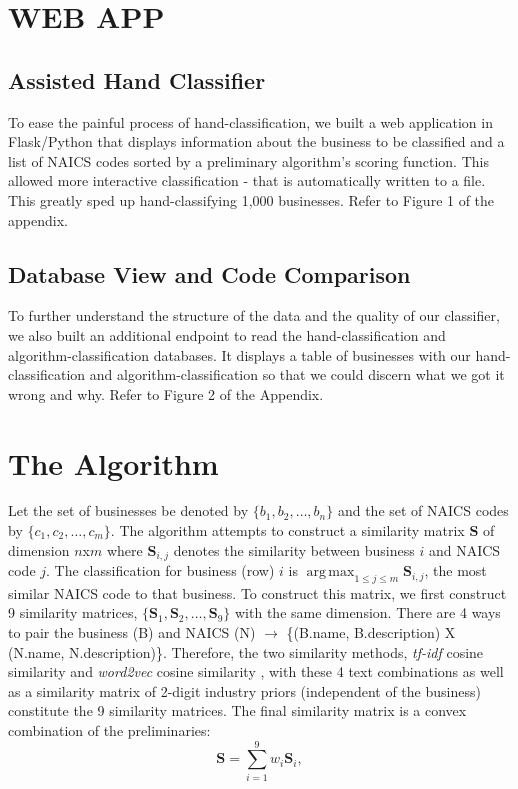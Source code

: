 \documentclass[letterpaper, 9 pt, conference]{IEEEtran}
\DeclareMathOperator*{\argmax}{arg\,max}
\newcommand{\matr}[1]{\mathbf{#1}}
\begin{document}
\section{WEB APP}

\subsection{Assisted Hand Classifier}

To ease the painful process of hand-classification, we built a web application in Flask/Python that displays information about the business to be classified and a list of NAICS codes sorted by a preliminary algorithm's scoring function. This allowed more interactive classification - that is automatically written to a file. This greatly sped up hand-classifying 1,000 businesses. Refer to Figure 1 of the appendix.

\subsection{Database View and Code Comparison}

To further understand the structure of the data and the quality of our classifier, we also built an additional endpoint to read the hand-classification and algorithm-classification databases. It displays a table of businesses with our hand-classification and algorithm-classification so that we could discern what we got it wrong and why. Refer to Figure 2 of the Appendix.

\section{The Algorithm}

Let the set of businesses be denoted by $\{b_1,b_2,\dots,b_n\}$ and the set of NAICS codes by $\{c_1,c_2,\dots,c_m\}$. The algorithm attempts to construct a similarity matrix $\matr{S}$ of dimension $n$x$m$ where $\matr{S}_{i,j}$ denotes the similarity between business $i$ and NAICS code $j$. The classification for business (row) $i$ is $\argmax_{1 \leq j \leq m} \matr{S}_{i,j}$, the most similar NAICS code to that business. To construct this matrix, we first construct 9 similarity matrices, $\{\matr{S}_1,\matr{S}_2,\dots,\matr{S}_9\}$ with the same dimension. There are 4 ways to pair the business (B) and NAICS (N) $\rightarrow$ \{(B.name, B.description) X (N.name, N.description)\}. Therefore, the two similarity methods, \textit{tf-idf} cosine similarity \cite{tfidf} and \textit{word2vec} cosine similarity \cite{neural}, with these 4 text combinations as well as a similarity matrix of 2-digit industry priors (independent of the business) constitute the 9 similarity matrices. The final similarity matrix is a convex combination of the preliminaries: \[ \matr{S} = \sum_{i=1}^9 w_i \matr{S}_i, \]
\end{document}
